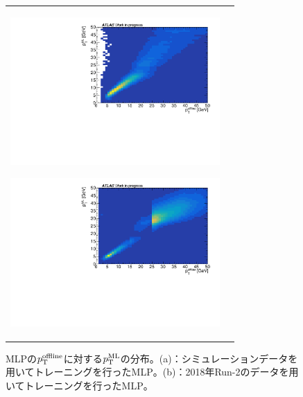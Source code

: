 \begin{figure}
    \begin{tabular}{cc}
    \centering
    \begin{minipage}[b]{0.45\hsize}%
        \centering
        \hspace*{-1cm}
        \includegraphics[clip, width=8cm]{fig/4/MC_pred_true_25.pdf}
        \subcaption{}
        \label{fig:zannsa_25_MC}
    \end{minipage}%
    \begin{minipage}[b]{0.7\hsize}%
        \centering
        \includegraphics[clip, width=8cm]{fig/4/pred_true_25_v1.pdf}
        \subcaption{}
        \label{fig:zannsa_25_Data}
    \end{minipage}%
    \end{tabular}
    \caption{MLPの$p_{\rm{T}}^{\rm{offline}}$に対する$p_{\rm{T}}^{\rm{ML}}$の分布。(a)：シミュレーションデータを用いてトレーニングを行ったMLP。(b)：2018年Run-2のデータを用いてトレーニングを行ったMLP。}
    \label{25}
\end{figure}




